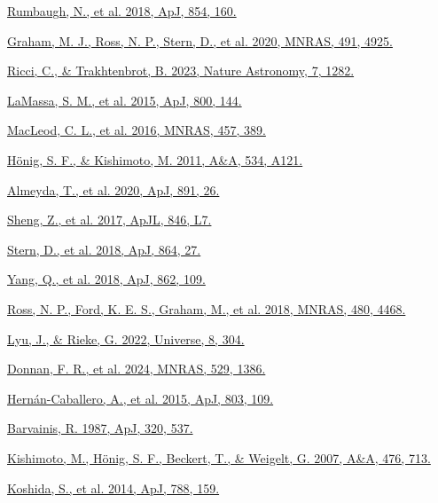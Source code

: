 \documentclass[12pt]{article}
\begin{document}
\noindent [1] \href{https://doi.org/10.3847/1538-4357/aaa9b6}{Rumbaugh, N., et al. 2018, ApJ, 854, 160.}\par
\noindent [2] \href{https://doi.org/10.1093/mnras/stz3244}{Graham, M. J., Ross, N. P., Stern, D., et al. 2020, MNRAS, 491, 4925.}\par
\noindent [3] \href{https://www.nature.com/articles/s41550-023-02108-4}{Ricci, C., \& Trakhtenbrot, B. 2023, Nature Astronomy, 7, 1282.}\par
\noindent [4] \href{https://doi.org/10.1088/0004-637X/800/2/144}{LaMassa, S. M., et al. 2015, ApJ, 800, 144.}\par
\noindent [5] \href{https://doi.org/10.1093/mnras/stv2997}{MacLeod, C. L., et al. 2016, MNRAS, 457, 389.}\par
\noindent [6] \href{https://doi.org/10.1051/0004-6361/201117750}{H\"onig, S. F., \& Kishimoto, M. 2011, A\&A, 534, A121.}\par
\noindent [7] \href{https://doi.org/10.3847/1538-4357/ab6aa1}{Almeyda, T., et al. 2020, ApJ, 891, 26.}\par
\noindent [8] \href{https://authors.library.caltech.edu/records/qjtjh-0cw44}{Sheng, Z., et al. 2017, ApJL, 846, L7.}\par
\noindent [9] \href{https://authors.library.caltech.edu/records/azy2b-r2w44}{Stern, D., et al. 2018, ApJ, 864, 27.}\par
\noindent [10] \href{https://arxiv.org/abs/1711.08122}{Yang, Q., et al. 2018, ApJ, 862, 109.}\par
\noindent [11] \href{https://doi.org/10.1093/mnras/sty2002}{Ross, N. P., Ford, K. E. S., Graham, M., et al. 2018, MNRAS, 480, 4468.}\par
\noindent [12] \href{https://doi.org/10.3390/universe8060304}{Lyu, J., \& Rieke, G. 2022, Universe, 8, 304.}\par
\noindent [13] \href{https://doi.org/10.1093/mnras/stae612}{Donnan, F. R., et al. 2024, MNRAS, 529, 1386.}\par
\noindent [14] \href{https://doi.org/10.1088/0004-637X/803/2/109}{Hern\'an-Caballero, A., et al. 2015, ApJ, 803, 109.}\par
\noindent [15] \href{https://articles.adsabs.harvard.edu/pdf/1987ApJ...320..537B}{Barvainis, R. 1987, ApJ, 320, 537.}\par
\noindent [16] \href{https://doi.org/10.1051/0004-6361:20077911}{Kishimoto, M., H\"onig, S. F., Beckert, T., \& Weigelt, G. 2007, A\&A, 476, 713.}\par
\noindent [17] \href{https://arxiv.org/abs/1406.2078}{Koshida, S., et al. 2014, ApJ, 788, 159.}\par
\end{document}
